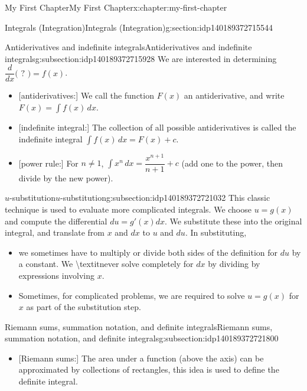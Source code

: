 \documentclass[oneside,10pt,]{book}
\begin{document}
\begin{chapterptx}{My First Chapter}{}{My First Chapter}{}{}{x:chapter:my-first-chapter}
\begin{sectionptx}{Integrals (Integration)}{}{Integrals (Integration)}{}{}{g:section:idp140189372715544}
\begin{subsectionptx}{Antiderivatives and indefinite integrals}{}{Antiderivatives and indefinite integrals}{}{}{g:subsection:idp140189372715928}
We are interested in determining \(\displaystyle \dfrac{d}{dx}\Big(\,\,?\,\,\Big) = f(x)\).%
\begin{itemize}[label=\textbullet]
\item{}[antiderivatives:] We call the function \(F(x)\) an antiderivative, and write \(\displaystyle F(x) = \int f(x)\,dx\).%
\item{}[indefinite integral:] The collection of all possible antiderivatives is called the indefinite integral \(\displaystyle \int f(x)\,dx = F(x) + c\).%
\item{}[power rule:] For \(n\neq1\), \(\displaystyle \int x^n\,dx = \dfrac{x^{n+1}}{n+1}+c\) (add one to the power, then divide by the new power).%
\end{itemize}
%
\end{subsectionptx}
%
%
\typeout{************************************************}
\typeout{************************************************}
%
\begin{subsectionptx}{\(u\)-substitution}{}{\(u\)-substitution}{}{}{g:subsection:idp140189372721032}
This classic technique is used to evaluate more complicated integrals.  We choose \(u = g(x)\) and compute the differential \(du = g'(x)dx\). We substitute these into the original integral, and translate from \(x\) and \(dx\) to \(u\) and \(du\).  In substituting,%
\begin{itemize}[label=\textbullet]
\item{}we sometimes have to multiply or divide both sides of the definition for \(du\) by a constant.  We \textbackslash{}textit\textbraceleft{}never\textbraceright{} solve completely for \(dx\) by dividing by expressions involving \(x\).%
\item{}Sometimes, for complicated problems, we are required to solve \(u = g(x)\) for \(x\) as part of the substitution step.%
\end{itemize}
%
\end{subsectionptx}
%
%
\typeout{************************************************}
\typeout{************************************************}
%
\begin{subsectionptx}{Riemann sums, summation notation, and definite integrals}{}{Riemann sums, summation notation, and definite integrals}{}{}{g:subsection:idp140189372721800}
%
\begin{itemize}[label=\textbullet]
\item{}[Riemann sums:] The area under a function (above the axis) can be approximated by collections of rectangles, this idea is used to define the definite integral.%

\end{itemize}
\end{subsectionptx}
\end{sectionptx}
\end{chapterptx}
\end{document}
